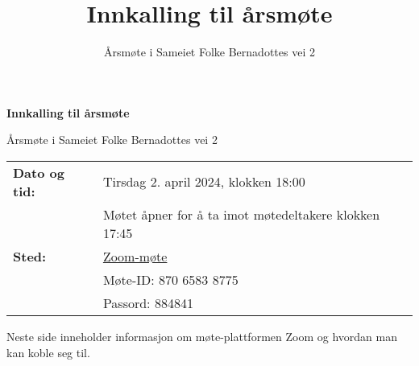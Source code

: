 \documentclass[12pt]{article}
\title{\LARGE\bf Innkalling til årsmøte}
\author{Årsmøte i Sameiet Folke Bernadottes vei 2}
\date{}
\begin{document}
\begin{centering}
  {\LARGE\bf Innkalling til årsmøte}

  {\large Årsmøte i Sameiet Folke Bernadottes vei 2}

\bigskip

\begin{tabular}{ll}
  {\bf Dato og tid:} & Tirsdag 2. april 2024, klokken 18:00 \\
  & Møtet åpner for å ta imot møtedeltakere klokken 17:45
  \vspace{1ex}\\
  {\bf Sted:} & \href{https://us06web.zoom.us/j/87065838775?pwd=JbFFvkZyW09SXWT8135ZAohAycffxC.1}{Zoom-møte}\\
  & Møte-ID: 870 6583 8775 \\
  & Passord: 884841
\end{tabular}
\end{centering}

\bigskip

Neste side inneholder informasjon om møte-plattformen Zoom og hvordan man kan koble seg til.\bigskip
\end{document}
